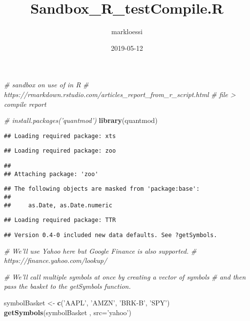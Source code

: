 \documentclass[]{article}
\title{Sandbox\_R\_testCompile.R}
\author{markloessi}
\date{2019-05-12}
\newenvironment{Shaded}{\begin{snugshade}}{\end{snugshade}}
\newcommand{\KeywordTok}[1]{\textcolor[rgb]{0.13,0.29,0.53}{\textbf{#1}}}
\newcommand{\DataTypeTok}[1]{\textcolor[rgb]{0.13,0.29,0.53}{#1}}
\newcommand{\StringTok}[1]{\textcolor[rgb]{0.31,0.60,0.02}{#1}}
\newcommand{\CommentTok}[1]{\textcolor[rgb]{0.56,0.35,0.01}{\textit{#1}}}
\newcommand{\NormalTok}[1]{#1}
\begin{document}
\maketitle

\begin{Shaded}
\begin{Highlighting}[]
\CommentTok{# sandbox on use of in R}
\CommentTok{# https://rmarkdown.rstudio.com/articles_report_from_r_script.html}
\CommentTok{# file > compile report}

\CommentTok{# install.packages('quantmod')}
\KeywordTok{library}\NormalTok{(quantmod)}
\end{Highlighting}
\end{Shaded}

\begin{verbatim}
## Loading required package: xts
\end{verbatim}

\begin{verbatim}
## Loading required package: zoo
\end{verbatim}

\begin{verbatim}
## 
## Attaching package: 'zoo'
\end{verbatim}

\begin{verbatim}
## The following objects are masked from 'package:base':
## 
##     as.Date, as.Date.numeric
\end{verbatim}

\begin{verbatim}
## Loading required package: TTR
\end{verbatim}

\begin{verbatim}
## Version 0.4-0 included new data defaults. See ?getSymbols.
\end{verbatim}

\begin{Shaded}
\begin{Highlighting}[]
\CommentTok{# We'll use Yahoo here but Google Finance is also supported. }
\CommentTok{# https://finance.yahoo.com/lookup/}

\CommentTok{# We'll call multiple symbols at once by creating a vector of symbols}
\CommentTok{# and then pass the basket to the getSymbols function.}

\NormalTok{symbolBasket <-}\StringTok{ }\KeywordTok{c}\NormalTok{(}\StringTok{'AAPL'}\NormalTok{, }\StringTok{'AMZN'}\NormalTok{, }\StringTok{'BRK-B'}\NormalTok{, }\StringTok{'SPY'}\NormalTok{)}
\KeywordTok{getSymbols}\NormalTok{(symbolBasket , }\DataTypeTok{src=}\StringTok{'yahoo'}\NormalTok{)}
\end{Highlighting}
\end{Shaded}
\end{document}
